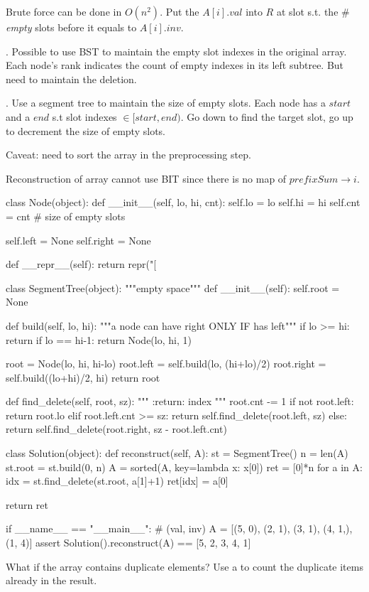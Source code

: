 Brute force can be done in $O(n^2)$. Put the $A[i].val$ into $R$ at slot s.t. the \# \textit{empty} slots before it equals to $A[i].inv$.

. Possible to use BST to maintain the empty slot indexes in the original array. Each node's rank indicates the count of empty indexes in its left subtree. But need to maintain the deletion.  

. Use a segment tree to maintain the size of empty slots. Each node has a $start$ and a $end$ s.t slot indexes $\in [start, end)$. Go down to find the target slot, go up to decrement the size of empty slots. 

Caveat: need to sort the array in the preprocessing step. 

Reconstruction of array cannot use BIT since there is no map of $prefixSum \rightarrow i$.

\begin{python}
class Node(object):
  def __init__(self, lo, hi, cnt):
    self.lo = lo
    self.hi = hi
    self.cnt = cnt  # size of empty slots

    self.left = None
    self.right = None

  def __repr__(self):
    return repr("[%


class SegmentTree(object):
  """empty space"""
  def __init__(self):
    self.root = None

  def build(self, lo, hi):
    """a node can have right ONLY IF has left"""
    if lo >= hi: return
    if lo == hi-1: return Node(lo, hi, 1)

    root = Node(lo, hi, hi-lo)
    root.left = self.build(lo, (hi+lo)/2)
    root.right = self.build((lo+hi)/2, hi)
    return root

  def find_delete(self, root, sz):
    """
    :return: index
    """
    root.cnt -= 1
    if not root.left:
      return root.lo
    elif root.left.cnt >= sz:
      return self.find_delete(root.left, sz)
    else:
      return self.find_delete(root.right,
                  sz - root.left.cnt)


class Solution(object):
  def reconstruct(self, A):
    st = SegmentTree()
    n = len(A)
    st.root = st.build(0, n)
    A = sorted(A, key=lambda x: x[0])
    ret = [0]*n
    for a in A:
      idx = st.find_delete(st.root, a[1]+1)
      ret[idx] = a[0]

    return ret


if __name__ == "__main__":
  # (val, inv)
  A = [(5, 0), (2, 1), (3, 1), (4, 1,), (1, 4)]
  assert Solution().reconstruct(A) == [5, 2, 3, 4, 1]
\end{python}

 What if the array contains duplicate elements? Use a  to count the duplicate items already in the result. 
